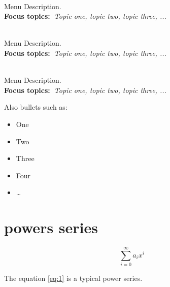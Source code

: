   \begin{description}\addtolength{\itemsep}{-0.35\baselineskip}%
    \item[\textbullet~\bfseries Menu Item] \hfill \\%
      Menu Description.~\\%
      {\textbf{Focus topics:~}\emph{Topic one, topic two, topic three, ...}}%
    \item[\textbullet~\bfseries Menu Item] \hfill \\%
      Menu Description.~\\%
      {\textbf{Focus topics:~}\emph{Topic one, topic two, topic three, ...}}%
    \item[\textbullet~\bfseries Menu Item] \hfill \\%
      Menu Description.~\\%
      {\textbf{Focus topics:~}\emph{Topic one, topic two, topic three, ...}}%
  \end{description}

  Also bullets such as:%
  \begin{itemize}\addtolength{\itemsep}{-0.35\baselineskip}%
    \item One%
    \item Two%
    \item Three%
    \item Four%
    \item \ldots%
  \end{itemize}%
\section{powers series} \label{subsection}

\begin{equation} \label{eq:1}
\sum_{i=0}^{\infty} a_i x^i
\end{equation}

The equation \ref{eq:1} is a typical power series.